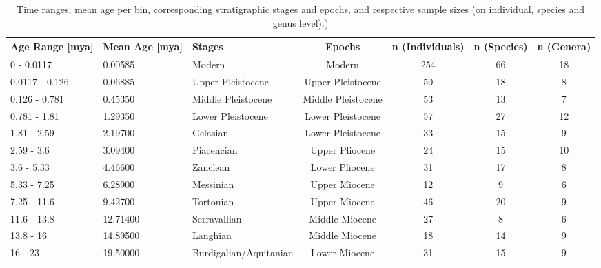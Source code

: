 \begin{landscape}\label{data}
	\begin{longtable}[]{@{}lllcccc@{}}
		\caption[Sample sizes per time bins]{Time ranges, mean age per bin, corresponding stratigraphic stages and epochs, and respective sample sizes (on individual, species and genus level).)}
		\label{tab:bins}\tabularnewline
		\toprule
		Age Range [mya] & Mean Age [mya] & Stages & Epochs & n (Individuals) & n (Species) & n (Genera)\tabularnewline
		\midrule
		\endhead
		0 - 0.0117 & 0.00585 & Modern & Modern & 254 & 66 & 18\tabularnewline
		0.0117 - 0.126 & 0.06885 & Upper Pleistocene & Upper Pleistocene & 50
		& 18 & 8\tabularnewline
		0.126 - 0.781 & 0.45350 & Middle Pleistocene & Middle Pleistocene & 53
		& 13 & 7\tabularnewline
		0.781 - 1.81 & 1.29350 & Lower Pleistocene & Lower Pleistocene & 57 &
		27 & 12\tabularnewline
		1.81 - 2.59 & 2.19700 & Gelasian & Lower Pleistocene & 33 & 15 &
		9\tabularnewline
		2.59 - 3.6 & 3.09400 & Piacencian & Upper Pliocene & 24 & 15 &
		10\tabularnewline
		3.6 - 5.33 & 4.46600 & Zanclean & Lower Pliocene & 31 & 17 &
		8\tabularnewline
		5.33 - 7.25 & 6.28900 & Messinian & Upper Miocene & 12 & 9 &
		6\tabularnewline
		7.25 - 11.6 & 9.42700 & Tortonian & Upper Miocene & 46 & 20 &
		9\tabularnewline
		11.6 - 13.8 & 12.71400 & Serravallian & Middle Miocene & 27 & 8 &
		6\tabularnewline
		13.8 - 16 & 14.89500 & Langhian & Middle Miocene & 18 & 14 &
		9\tabularnewline
		16 - 23 & 19.50000 & Burdigalian/Aquitanian & Lower Miocene & 31 & 15 & 9\tabularnewline
		\bottomrule
	\end{longtable}
\end{landscape}






\FloatBarrier

